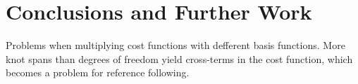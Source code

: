 
\chapter{Conclusions and Further Work}
\label{chap:conclusions}

Problems when multiplying cost functions with defferent basis functions. More knot spans than degrees of freedom yield cross-terms in the cost function, which becomes a problem for reference following.
